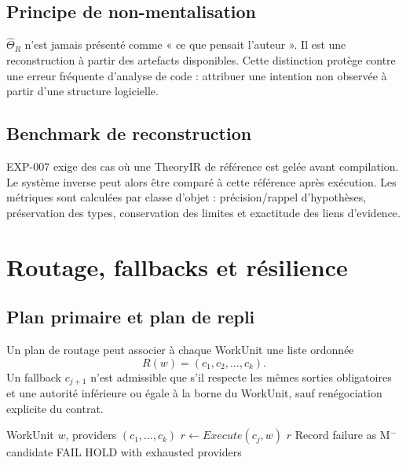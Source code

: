 \section{Principe de non-mentalisation}

$\widehat\Theta_R$ n'est jamais présenté comme « ce que pensait l'auteur ». Il est une reconstruction à partir des artefacts disponibles. Cette distinction protège contre une erreur fréquente d'analyse de code : attribuer une intention non observée à partir d'une structure logicielle.

\section{Benchmark de reconstruction}

EXP-007 exige des cas où une TheoryIR de référence est gelée avant compilation. Le système inverse peut alors être comparé à cette référence après exécution. Les métriques sont calculées par classe d'objet : précision/rappel d'hypothèses, préservation des types, conservation des limites et exactitude des liens d'evidence.

\chapter{Routage, fallbacks et résilience}

\section{Plan primaire et plan de repli}

Un plan de routage peut associer à chaque WorkUnit une liste ordonnée
\[
R(w)=(c_1,c_2,\ldots,c_k).
\]
Un fallback $c_{j+1}$ n'est admissible que s'il respecte les mêmes sorties obligatoires et une autorité inférieure ou égale à la borne du WorkUnit, sauf renégociation explicite du contrat.

\begin{algorithm}
\caption{Exécution avec fallback borné}
\begin{algorithmic}[1]
\Require WorkUnit $w$, providers $(c_1,\dots,c_k)$
  \State $r\gets Execute(c_j,w)$
    \State \Return $r$
  \EndIf
  \State Record failure as M$^-$ candidate
    \State \Return FAIL
  \EndIf
\EndFor
\State \Return HOLD with exhausted providers
\end{algorithmic}
\end{algorithm}

